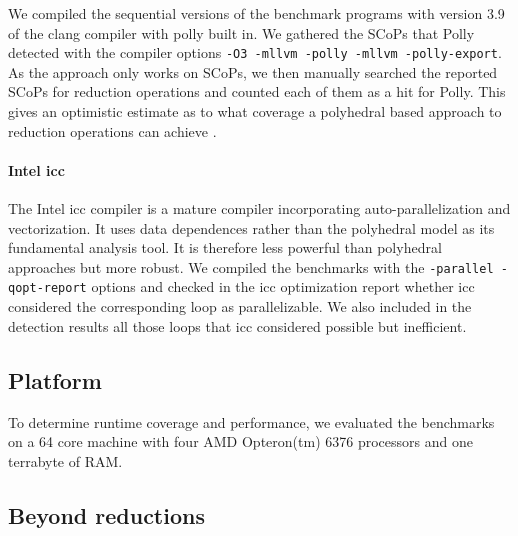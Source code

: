 We compiled the sequential versions of the benchmark programs with
version 3.9 of the clang compiler with polly built in.  We gathered
the SCoPs that Polly detected with the compiler options \texttt{-O3
-mllvm -polly -mllvm -polly-export}. As the approach only works on SCoPs,
we then manually searched the
reported SCoPs for reduction operations and counted each of them as a
hit for Polly.  This gives an optimistic  estimate as to what coverage a
polyhedral based approach to reduction operations can achieve \cite{Doerfert2015Polly}.

\paragraph{Intel icc}
The Intel icc compiler is a mature compiler incorporating
auto-parallelization and vectorization. It uses data dependences rather than the polyhedral model as its fundamental analysis tool.
It is therefore less powerful than polyhedral approaches but more robust.  We compiled the benchmarks with
the \texttt{-parallel -qopt-report} options
and  checked in the icc
optimization report whether icc considered the corresponding loop as
parallelizable.  We also included in the detection results all those loops that
icc considered possible but inefficient.


\subsection{Platform}
To determine runtime coverage and performance, we evaluated the benchmarks on a 64 core machine with four AMD Opteron(tm) 6376 processors and one terrabyte of RAM.





\subsection{Beyond reductions}

